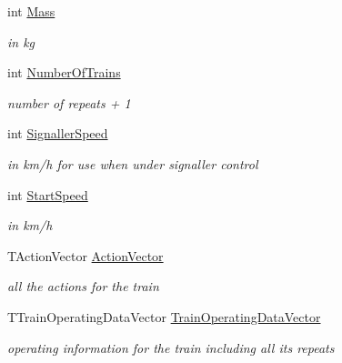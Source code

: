 \begin{DoxyCompactItemize}
int \mbox{\hyperlink{class_t_train_data_entry_a16d6c71abfab0a1ebd961fe3cd3edae7}{Mass}}
\begin{DoxyCompactList}\small\item\em in kg \end{DoxyCompactList}\item 
\mbox{\label{class_t_train_data_entry_a977ccbe485d557d4c4a597f5de2251c4}} 
int \mbox{\hyperlink{class_t_train_data_entry_a977ccbe485d557d4c4a597f5de2251c4}{Number\+Of\+Trains}}
\begin{DoxyCompactList}\small\item\em number of repeats + 1 \end{DoxyCompactList}\item 
\mbox{\label{class_t_train_data_entry_a5ffd52b10fc56a29a823b918a40197e8}} 
int \mbox{\hyperlink{class_t_train_data_entry_a5ffd52b10fc56a29a823b918a40197e8}{Signaller\+Speed}}
\begin{DoxyCompactList}\small\item\em in km/h for use when under signaller control \end{DoxyCompactList}\item 
\mbox{\label{class_t_train_data_entry_a573e640a04585cde4c5bbe2bced866d6}} 
int \mbox{\hyperlink{class_t_train_data_entry_a573e640a04585cde4c5bbe2bced866d6}{Start\+Speed}}
\begin{DoxyCompactList}\small\item\em in km/h \end{DoxyCompactList}\item 
\mbox{\label{class_t_train_data_entry_a73872a2abaa9d09a3f392b4e6f725289}} 
T\+Action\+Vector \mbox{\hyperlink{class_t_train_data_entry_a73872a2abaa9d09a3f392b4e6f725289}{Action\+Vector}}
\begin{DoxyCompactList}\small\item\em all the actions for the train \end{DoxyCompactList}\item 
\mbox{\label{class_t_train_data_entry_a384ddee4ede5a1962011bdc0fc3c7587}} 
T\+Train\+Operating\+Data\+Vector \mbox{\hyperlink{class_t_train_data_entry_a384ddee4ede5a1962011bdc0fc3c7587}{Train\+Operating\+Data\+Vector}}
\begin{DoxyCompactList}\small\item\em operating information for the train including all its repeats \end{DoxyCompactList}\end{DoxyCompactItemize}



